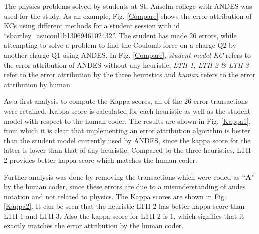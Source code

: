 \documentclass[conference]{IEEEtran}
\begin{document}
The physics problems solved by students at St. Anselm college with ANDES was used for the study. As an example, Fig. \ref{Compare} shows the error-attribution of KCs using different methods for a student session with id ``sbartley\_asucoul1b1306946102432''. The student has made 26 errors, while attempting to solve a problem to find the Coulomb force on a charge Q2 by another charge Q1 using ANDES. In Fig. \ref{Compare}, \textit{student model KC} refers to the error attribution of ANDES without any heuristic, \textit{LTH-1, LTH-2 \& LTH-3} refer to the error attribution by the three heuristics and \textit{human} refers to the error attribution by human.

As a first analysis to compute the Kappa scores, all of the 26 error transactions were retained. Kappa score is calculated for each heuristic as well as the student model with respect to the human coder. The results are shown in Fig. \ref{Kappa1}, from which it is clear that implementing an error attribution algorithm is better than the student model currently used by ANDES, since the kappa score for the latter is lower than that of any heuristic. Compared to the three heuristics, LTH-2 provides better kappa score which matches the human coder.

Further analysis was done by removing the transactions which were coded as ``\textbf{A}'' by the human coder, since these errors are due to a misunderstanding of andes notation and not related to physics. The Kappa scores are shown in Fig. \ref{Kappa2}. It can be seen that the heuristic LTH-2 has better kappa score than LTH-1 and LTH-3. Also the kappa score for LTH-2 is 1, which signifies that it exactly matches the error attribution by the human coder.
\end{document}
